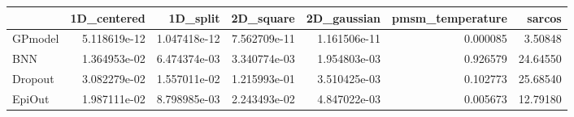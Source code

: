 \begin{tabular}{lrrrrrr}
\toprule
{} &   1D\_centered &      1D\_split &     2D\_square &   2D\_gaussian &  pmsm\_temperature &    sarcos \\
\midrule
GPmodel &  5.118619e-12 &  1.047418e-12 &  7.562709e-11 &  1.161506e-11 &          0.000085 &   3.50848 \\
BNN     &  1.364953e-02 &  6.474374e-03 &  3.340774e-03 &  1.954803e-03 &          0.926579 &  24.64550 \\
Dropout &  3.082279e-02 &  1.557011e-02 &  1.215993e-01 &  3.510425e-03 &          0.102773 &  25.68540 \\
EpiOut  &  1.987111e-02 &  8.798985e-03 &  2.243493e-02 &  4.847022e-03 &          0.005673 &  12.79180 \\
\bottomrule
\end{tabular}
